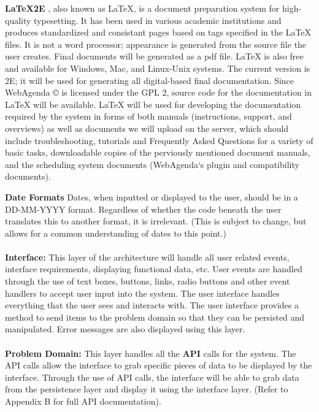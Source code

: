 \documentclass[letterpaper,12pt]{report}
\begin{document}
\textbf{LaTeX2E} , also known as LaTeX, is a document preparation system for high-quality typesetting. It has been used in various academic institutions and produces standardized and consistant pages based on tags specified in the LaTeX files. It is not a word processor; appearance is generated from the source file the user creates. Final documents will be generated as a pdf file.
LaTeX is also free and available for Windows, Mac, and Linux-Unix systems. The current version is 2E; it will be used for generating all digital-based final documentation. Since WebAgenda © is licensed under the GPL 2, source code for the documentation in LaTeX will be available.
LaTeX will be used for developing the documentation required by the system in forms of both manuals (instructions, support, and overviews) as well as documents we will upload on the server, which should include troubleshooting, tutorials and Frequently Asked Questions for a variety of basic tasks, downloadable copies of the perviously mentioned document manuals, and the scheduling system documents (WebAgenda`s plugin and compatibility documents).

\textbf{Date Formats}  Dates, when inputted or displayed to the user, should be in a DD-MM-YYYY format. Regardless of whether the code beneath the user translates this to another format, it is irrelevant. (This is subject to change, but allows for a common understanding of dates to this point.)


\paragraph{}\hspace{0.6cm}\textbf{Interface:} This layer of the architecture will handle all user related events, interface requirements, displaying functional data, etc. User events are handled through the use of text boxes, buttons, links, radio buttons and other event handlers to accept user input into the system. The user interface handles everything that the user sees and interacts with. The user interface provides a method to send items to the problem domain so that they can be persisted and manipulated. Error messages are also displayed using this layer.
\pagebreak
\paragraph{}\hspace{0.6cm}\textbf{Problem Domain:} This layer handles all the \textbf{API} calls for the system. The API calls allow the interface to grab specific pieces of data to be displayed by the interface. Through the use of API calls, the interface will be able to grab data from the persistence layer and display it using the interface layer. (Refer to Appendix B for full API documentation).
\end{document}
